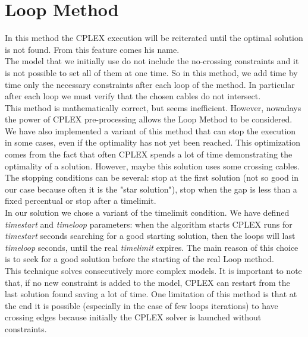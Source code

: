 \section{Loop Method}
In this method the \textsc{CPLEX} execution will be reiterated until the optimal solution is not found. From this feature comes his name. \\
The model that we initially use do not include the no-crossing constraints and it is not possible to set all of them at one time. So in this method, we add time by time only the necessary constraints after each loop of the method. In particular after each loop we must verify that the chosen cables do not intersect.\\
This method is mathematically correct, but seems inefficient. However, nowadays the power of \textsc{CPLEX} pre-processing allows the Loop Method to be considered. We have also implemented a variant of this method that can stop the execution in some cases, even if the optimality has not yet been reached. This optimization comes from the fact that often \textsc{CPLEX} spends a lot of time demonstrating the optimality of a solution. However, maybe this solution uses some crossing cables. The stopping conditions can be several: stop at the first solution (not so good in our case because often it is the "star solution"), stop when the gap is less than a fixed percentual or stop after a timelimit. \\
In our solution we chose a variant of the timelimit condition. We have defined \textit{timestart} and \textit{timeloop} parameters: when the algorithm starts \textsc{CPLEX} runs for \textit{timestart} seconds searching for a good starting solution, then the loops will last \textit{timeloop} seconds, until the real \textit{timelimit} expires. The main reason of this choice is to seek for a good solution before the starting of the real Loop method. \\ 
This technique solves consecutively more complex models. It is important to note that, if no new constraint is added to the model, \textsc{CPLEX} can restart from the last solution found saving a lot of time. One limitation of this method is that at the end it is possible (especially in the case of few loops iterations) to have crossing edges because initially the \textsc{CPLEX} solver is launched without constraints. 
